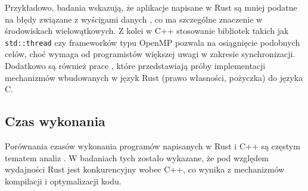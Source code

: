 Przykładowo, badania \cite{RustSafety1, RustSafety2, RustSafety3} wskazują, że aplikacje napisane w Rust są mniej podatne na błędy związane z wyścigami danych , co ma szczególne znaczenie w środowiskach wielowątkowych. Z kolei w C++ stosowanie bibliotek takich jak \texttt{std::thread} czy frameworków typu OpenMP pozwala na osiągnięcie podobnych celów, choć wymaga od programistów większej uwagi w zakresie synchronizacji. Dodatkowo są również prace \cite{PPL1_1,PPL1_2}, które przedstawiają próby implementacji mechanizmów wbudowanych w język Rust (prawo własności, pożyczka) do języka C.
\subsection{Czas wykonania}
\label{CzasWykonania}
Porównania czasów wykonania programów napisanych w Rust i C++ są częstym tematem analiz \cite{RustPerformance1, RustPerformance2, RustPerformance3, RustPerformance4}. W badaniach tych zostało wykazane, że pod względem wydajności Rust jest konkurencyjny wobec C++, co wynika z mechanizmów kompilacji i optymalizacji kodu.

